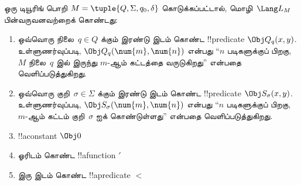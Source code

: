\documentclass[../../../include/open-logic-section]{subfiles}
\begin{document}
\begin{defn}
ஒரு டியூரிங் பொறி $M = \tuple{Q, \Sigma, q_0, \delta}$
கொடுக்கப்பட்டால், மொழி~$\Lang L_M$ பின்வருவனவற்றைக் கொண்டது:
\begin{enumerate}
\item ஒவ்வொரு நிலை~$q \in Q$ க்கும் இரண்டு இடம் கொண்ட
!!{predicate} $\Obj Q_q(x, y)$. உள்ளுணர்வுப்படி,
$\Obj Q_q(\num{m}, \num{n})$ என்பது ``$n$ படிகளுக்குப் பிறகு,
~$M$ நிலை~$q$ இல் இருந்து $m$-ஆம் கட்டத்தை வருடுகிறது'' என்பதை
வெளிப்படுத்துகிறது.
\item ஒவ்வொரு குறி~$\sigma\in \Sigma$ க்கும் இரண்டு இடம் கொண்ட
!!{predicate} $\Obj S_\sigma(x, y)$. உள்ளுணர்வுப்படி,
$\Obj S_\sigma(\num{m}, \num{n})$ என்பது ``$n$ படிகளுக்குப் பிறகு,
$m$-ஆம் கட்டம் குறி~$\sigma$ ஐக் கொண்டுள்ளது'' என்பதை வெளிப்படுத்துகிறது.
\item !!a{constant} $\Obj 0$
\item ஓரிடம் கொண்ட !!a{function} $\prime$
\item இரு இடம் கொண்ட !!a{predicate} $<$
\end{enumerate}
\end{defn}
\end{document}
